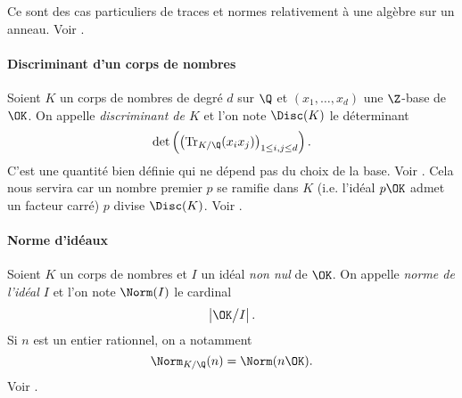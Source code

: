 	Ce sont des cas particuliers de traces et normes relativement à une algèbre sur un anneau. Voir \cite[ch. II § 6]{Samuel}.


\paragraph{Discriminant d'un corps de nombres} Soient $K$ un corps de nombres de degré $d$ sur $\Q$ et $(x_1, \dots, x_d)$ une $\Z$-base de $\OK$. On appelle \emph{discriminant de $K$} et l'on note $\Disc(K)$ le déterminant \[\det\left(\left(\mathrm{Tr}_{K/\Q}(x_i x_j)\right)_{1\leq i, j \leq d}\right).\] C'est une quantité bien définie qui ne dépend pas du choix de la base. Voir \cite[ch. II § 7]{Samuel}. Cela nous servira car un nombre premier $p$ se ramifie dans $K$ (i.e. l'idéal $p\OK$ admet un facteur carré) \ssi $p$ divise $\Disc(K)$. Voir \cite[ch. V § 3]{Samuel}.

\paragraph{Norme d'idéaux} Soient $K$ un corps de nombres et $I$ un idéal \emph{non nul} de $\OK$. On appelle \emph{norme de l'idéal $I$} et l'on note $\Norm(I)$ le cardinal \[\left|\OK\big/I\right|.\] Si $n$ est un entier rationnel, on a notamment \[\Norm_{K/\Q}(n) = \Norm(n\OK).\] Voir \cite[ch. III § 5]{Samuel}.
